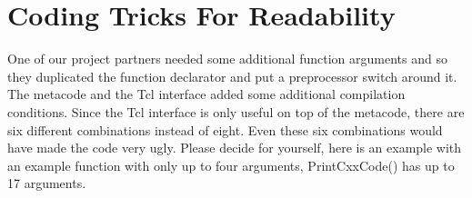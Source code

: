 
%
%
%

\chapter{\label{coding-tricks}Coding Tricks For Readability}


One of our project partners needed some additional function arguments and so they duplicated the function declarator and put a preprocessor switch around it.
The metacode and the Tcl interface added some additional compilation conditions.
Since the Tcl interface is only useful on top of the metacode, there are six different combinations instead of eight.
Even these six combinations would have made the code very ugly.
Please decide for yourself, here is an example with an example function with only up to four arguments, {\C PrintCxxCode()} has up to 17 arguments.

